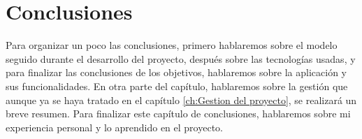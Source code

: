 \chapter{Conclusiones}
\label{ch:Conclusiones}
Para organizar un poco las conclusiones, primero hablaremos sobre el modelo seguido durante el desarrollo del proyecto, después sobre las tecnologías usadas, y para finalizar las conclusiones de los objetivos, hablaremos sobre la aplicación y sus funcionalidades. En otra parte del capítulo, hablaremos sobre la gestión que aunque ya se haya tratado en el capítulo \ref{ch:Gestion del proyecto}, se realizará un breve resumen. Para finalizar este capítulo de conclusiones, hablaremos sobre mi experiencia personal y lo aprendido en el proyecto.
\newpage

\newpage

\newpage





























